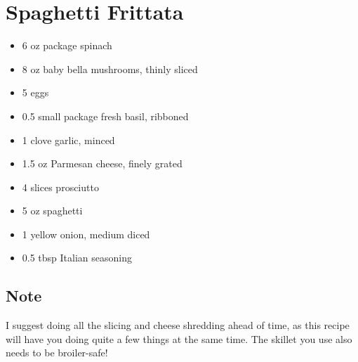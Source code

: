\section{Spaghetti Frittata}

\begin{itemize}
\item 6 oz package spinach
\item 8 oz baby bella mushrooms, thinly sliced
\item 5 eggs
\item 0.5 small package fresh basil, ribboned
\item 1 clove garlic, minced
\item 1.5 oz Parmesan cheese, finely grated
\item 4 slices prosciutto
\item 5 oz spaghetti
\item 1 yellow onion, medium diced
\item 0.5 tbsp Italian seasoning
\end{itemize}

\subsection{Note}

I suggest doing all the slicing and cheese shredding ahead of time, as this recipe will have you doing quite a few
things at the same time. The skillet you use also needs to be broiler-safe!

